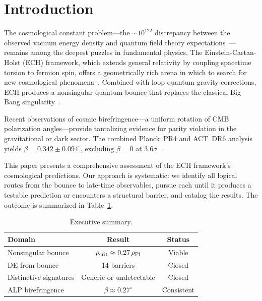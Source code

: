 \documentclass[aps,prd,twocolumn,superscriptaddress,showpacs,preprintnumbers,nofootinbib,longbibliography,floatfix]{revtex4-2}
\newcommand{\rhocrit}{\rho_{\rm crit}}
\newcommand{\rhoPl}{\rho_{\rm Pl}}
\begin{document}

\maketitle
\tableofcontents


\section{Introduction}\label{sec:intro}

The cosmological constant problem---the $\sim 10^{122}$ discrepancy between
the observed vacuum energy density and quantum field theory
expectations~\cite{Weinberg1989}---remains among the deepest puzzles in
fundamental physics.  The Einstein-Cartan-Holst (ECH) framework, which
extends general relativity by coupling spacetime torsion to fermion spin,
offers a geometrically rich arena in which to search for new cosmological
phenomena~\cite{Hehl1976,Shapiro2002}.  Combined with loop quantum gravity
corrections, ECH produces a nonsingular quantum bounce that replaces the
classical Big Bang singularity~\cite{Ashtekar2006,Bojowald2008,Poplawski2016}.

Recent observations of cosmic birefringence---a uniform rotation of CMB
polarization angles---provide tantalizing evidence for parity violation in
the gravitational or dark sector.  The combined Planck~PR4 and ACT~DR6
analysis yields $\beta = 0.342 \pm 0.094^\circ$, excluding $\beta = 0$ at
$3.6\sigma$~\cite{Eskilt2022,DiegoPalazuelos2022,ACTDR6bire}.

This paper presents a comprehensive assessment of the ECH framework's
cosmological predictions.  Our approach is systematic: we identify all logical
routes from the bounce to late-time observables, pursue each until it
produces a testable prediction or encounters a structural barrier, and catalog
the results.  The outcome is summarized in Table~\ref{tab:exec_summary}.

\begin{table}[h]
\centering
\caption{Executive summary.}
\label{tab:exec_summary}
\begin{tabular}{lcc}
\hline\hline
Domain & Result & Status \\
\hline
Nonsingular bounce & $\rhocrit \approx 0.27\,\rhoPl$ & Viable \\
DE from bounce & 14 barriers & Closed \\
Distinctive signatures & Generic or undetectable & Closed \\
ALP birefringence & $\beta \approx 0.27^\circ$ & Consistent \\
\hline\hline
\end{tabular}
\end{table}
\end{document}

